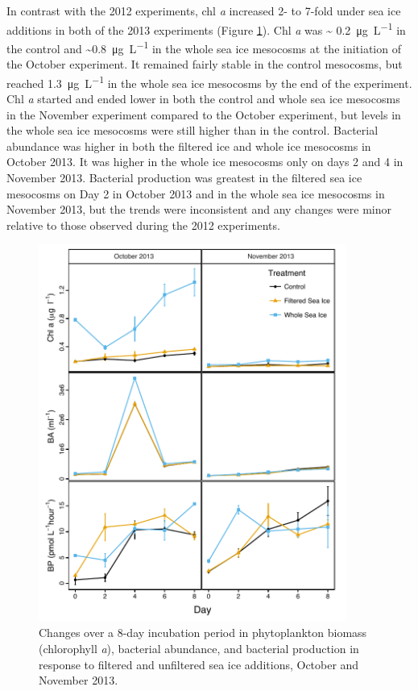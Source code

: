 In contrast with the 2012 experiments, chl \emph{a} increased 2- to 7-fold under sea ice additions in both of the 2013 experiments (Figure \ref{fig:ch5:initial}). Chl \emph{a} was \textasciitilde{} \SI{0.2}{\micro\gram\per\liter} in the control and \textasciitilde{}\SI{0.8}{\micro\gram\per\liter} in the whole sea ice mesocosms at the initiation of the October experiment. It remained fairly stable in the control mesocosms, but reached \SI{1.3}{\micro\gram\per\liter} in the whole sea ice mesocosms by the end of the experiment. Chl \emph{a} started and ended lower in both the control and whole sea ice mesocosms in the November experiment compared to the October experiment, but levels in the whole sea ice mesocosms were still higher than in the control. Bacterial abundance was higher in both the filtered ice and whole ice mesocosms in October 2013. It was higher in the whole ice mesocosms only on days 2 and 4 in November 2013. Bacterial production was greatest in the filtered sea ice mesocosms on Day 2 in October 2013 and in the whole sea ice mesocosms in November 2013, but the trends were inconsistent and any changes were minor relative to those observed during the 2012 experiments.

\begin{figure}[htbp] 
\centering 
\includegraphics[width=0.9\textwidth]{Chapter_6_SeaIce/Figures/Experiments_2013}
\caption{Changes over a 8-day incubation period in phytoplankton biomass (chlorophyll \emph{a}), bacterial abundance, and bacterial production in response to filtered and unfiltered sea ice additions, October and November 2013.} 
\label{fig:ch5:initial} 
\end{figure}

